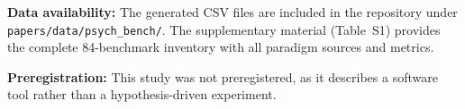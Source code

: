 \documentclass[11pt,letterpaper]{article}
\begin{document}
\noindent\textbf{Data availability:} The generated CSV files are included in the repository under \texttt{papers/\allowbreak{}data/\allowbreak{}psych\_bench/}. The supplementary material (Table~S1) provides the complete 84-benchmark inventory with all paradigm sources and metrics.

\noindent\textbf{Preregistration:} This study was not preregistered, as it describes a software tool rather than a hypothesis-driven experiment.



\end{document}

